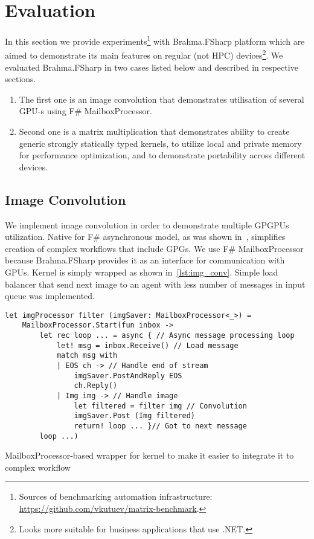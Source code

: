 \section{Evaluation}

In this section we provide experiments\footnote{Sources of benchmarking automation infrastructure: \url{https://github.com/vkutuev/matrix-benchmark}.} with Brahma.FSharp platform which are aimed to demonstrate its main features on regular (not HPC) devices\footnote{Looks more suitable for business applications that use .NET.}. 
We evaluated Brahma.FSharp in two cases listed below and described in respective sections.
\begin{enumerate}
\item The first one is an image convolution that demonstrates utilisation of several GPU-s using F\# MailboxProcessor.
\item Second one is a matrix multiplication that demonstrates ability to create generic strongly statically typed kernels, to utilize local and private memory for performance optimization, and to demonstrate portability across different devices.
\end{enumerate}


\subsection{Image Convolution}

We implement image convolution in order to demonstrate multiple GPGPUs utilization.
Native for F\# asynchronous model, as was shown in~\cite{aleaGPUasync}, simplifies creation of complex workflows that include GPGs.
We use F\# MailboxProcessor because Brahma.FSharp provides it as an interface for communication with GPUs.
Kernel is simply wrapped as shown in~\ref{lst:img_conv}. 
Simple load balancer that send next image to an agent with less number of messages in input queue was implemented.

\begin{listing}[h]
  \begin{verbatim}
let imgProcessor filter (imgSaver: MailboxProcessor<_>) =
    MailboxProcessor.Start(fun inbox ->
        let rec loop ... = async { // Async message processing loop
            let! msg = inbox.Receive() // Load message
            match msg with
            | EOS ch -> // Handle end of stream
                imgSaver.PostAndReply EOS
                ch.Reply()
            | Img img -> // Handle image
                let filtered = filter img // Convolution
                imgSaver.Post (Img filtered)
                return! loop ... }// Got to next message
        loop ...)
  \end{verbatim}
  \caption{MailboxProcessor-based wrapper for kernel to make it easier to integrate it to complex workflow}
  \label{lst:img_conv}
\end{listing}

